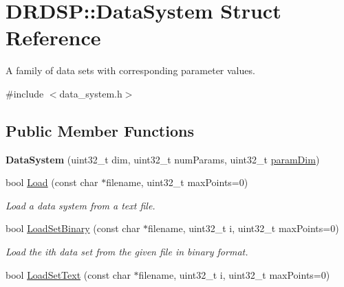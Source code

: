 \hypertarget{struct_d_r_d_s_p_1_1_data_system}{\section{D\-R\-D\-S\-P\-:\-:Data\-System Struct Reference}
\label{struct_d_r_d_s_p_1_1_data_system}
}


A family of data sets with corresponding parameter values.  




{\ttfamily \#include $<$data\-\_\-system.\-h$>$}

\subsection*{Public Member Functions}
\begin{DoxyCompactItemize}
\item 
\hypertarget{struct_d_r_d_s_p_1_1_data_system_aff122ec613cf26452c910ae884b11095}{{\bfseries Data\-System} (uint32\-\_\-t dim, uint32\-\_\-t num\-Params, uint32\-\_\-t \hyperlink{struct_d_r_d_s_p_1_1_data_system_a11e4d274af9cfc398b7f1b6b49427f9b}{param\-Dim})}\label{struct_d_r_d_s_p_1_1_data_system_aff122ec613cf26452c910ae884b11095}

\item 
\hypertarget{struct_d_r_d_s_p_1_1_data_system_a23b905c286750d16f9cd8996ad4c2076}{bool \hyperlink{struct_d_r_d_s_p_1_1_data_system_a23b905c286750d16f9cd8996ad4c2076}{Load} (const char $\ast$filename, uint32\-\_\-t max\-Points=0)}\label{struct_d_r_d_s_p_1_1_data_system_a23b905c286750d16f9cd8996ad4c2076}

\begin{DoxyCompactList}\small\item\em Load a data system from a text file. \end{DoxyCompactList}\item 
\hypertarget{struct_d_r_d_s_p_1_1_data_system_a1c2765c2e9a5b228dfd5c7487d67f94b}{bool \hyperlink{struct_d_r_d_s_p_1_1_data_system_a1c2765c2e9a5b228dfd5c7487d67f94b}{Load\-Set\-Binary} (const char $\ast$filename, uint32\-\_\-t i, uint32\-\_\-t max\-Points=0)}\label{struct_d_r_d_s_p_1_1_data_system_a1c2765c2e9a5b228dfd5c7487d67f94b}

\begin{DoxyCompactList}\small\item\em Load the ith data set from the given file in binary format. \end{DoxyCompactList}\item 
\hypertarget{struct_d_r_d_s_p_1_1_data_system_acf1c420d18c840b32fa5891f03253ee4}{bool \hyperlink{struct_d_r_d_s_p_1_1_data_system_acf1c420d18c840b32fa5891f03253ee4}{Load\-Set\-Text} (const char $\ast$filename, uint32\-\_\-t i, uint32\-\_\-t max\-Points=0)}\label{struct_d_r_d_s_p_1_1_data_system_acf1c420d18c840b32fa5891f03253ee4}


\end{DoxyCompactItemize}
